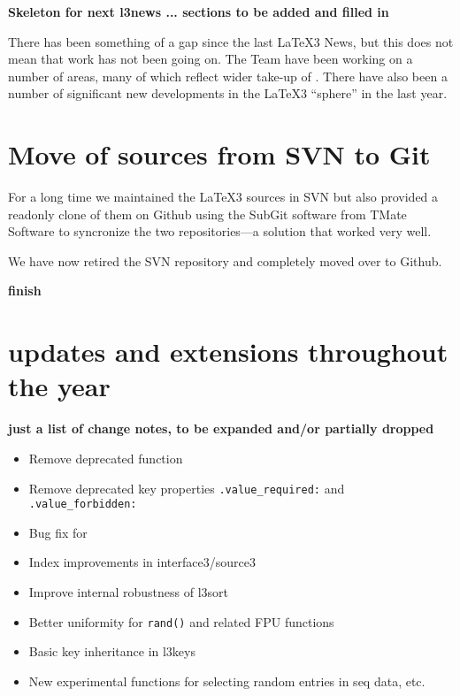 \documentclass{ltnews}
\begin{document}
\maketitle

\textbf{Skeleton for next l3news ... sections to be added and filled in}

There has been something of a gap since the last \LaTeX3 News, but this does
not mean that work has not been going on. The Team have been working on a
number of areas, many of which reflect wider take-up of . There have
also been a number of significant new developments in the \LaTeX3
\enquote{sphere} in the last year.

\section{Move of sources from SVN to Git}

For a long time we maintained the \LaTeX3 sources in SVN but also provided a
readonly clone of them on Github using the SubGit software from TMate Software
to syncronize the two repositories---a solution that worked very well.

We have now retired the SVN repository and completely moved over to
Github.

\textbf{finish}





\section{ updates and extensions throughout the year}

\textbf{just a list of change notes, to be expanded and/or partially dropped}



\begin{itemize}
\item Remove deprecated function 
\item Remove deprecated key properties \texttt{.value_required:}
  and \texttt{.value_forbidden:}
\item Bug fix for 
\item Index improvements in interface3/source3
\item Improve internal robustness of l3sort
\item Better uniformity for \texttt{rand()} and related
  FPU functions
\item Basic key inheritance in l3keys
\item New experimental functions for selecting random
  entries in seq data, etc.
\end{itemize}  
\end{document}
